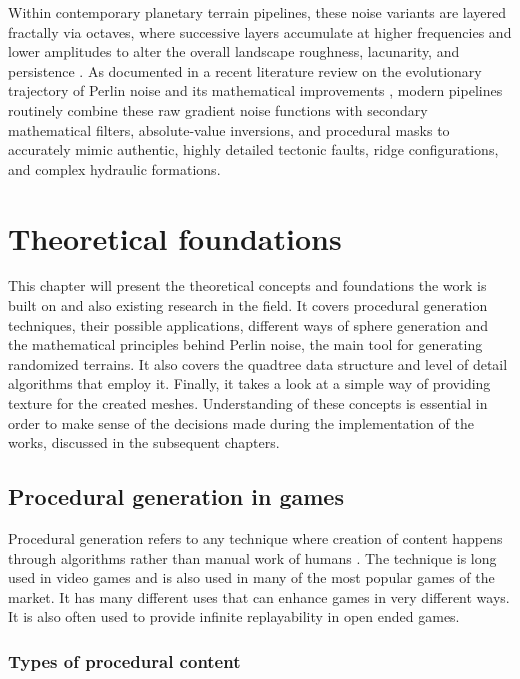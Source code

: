 \documentclass[12pt]{report}
\begin{document}
Within contemporary planetary terrain pipelines, these noise variants are layered fractally via octaves, where successive layers accumulate at higher frequencies and lower amplitudes to alter the overall landscape roughness, lacunarity, and persistence \cite{rose2016}. As documented in a recent literature review on the evolutionary trajectory of Perlin noise and its mathematical improvements \cite{wu2024}, modern pipelines routinely combine these raw gradient noise functions with secondary mathematical filters, absolute-value inversions, and procedural masks to accurately mimic authentic, highly detailed tectonic faults, ridge configurations, and complex hydraulic formations.
\newpage

\chapter{Theoretical foundations}

This chapter will present the theoretical concepts and foundations the work is built on and also existing research in the field. It covers procedural generation techniques, their possible applications, different ways of sphere generation and the mathematical principles behind Perlin noise, the main tool for generating randomized terrains. It also covers the quadtree data structure and level of detail algorithms that employ it. Finally, it takes a look at a simple way of providing texture for the created meshes. Understanding of these concepts is essential in order to make sense of the decisions made during the implementation of the works, discussed in the subsequent chapters.

\section{Procedural generation in games}

Procedural generation refers to any technique where creation of content happens through algorithms rather than manual work of humans \cite{short2017,rose2016,pcgsmith2012,hendrikx2013,Viana_dos_Santos_2021}. The technique is long used in video games and is also used in many of the most popular games of the market. It has many different uses that can enhance games in very different ways. It is also often used to provide infinite replayability in open ended games. 

\subsection{Types of procedural content}
\end{document}
